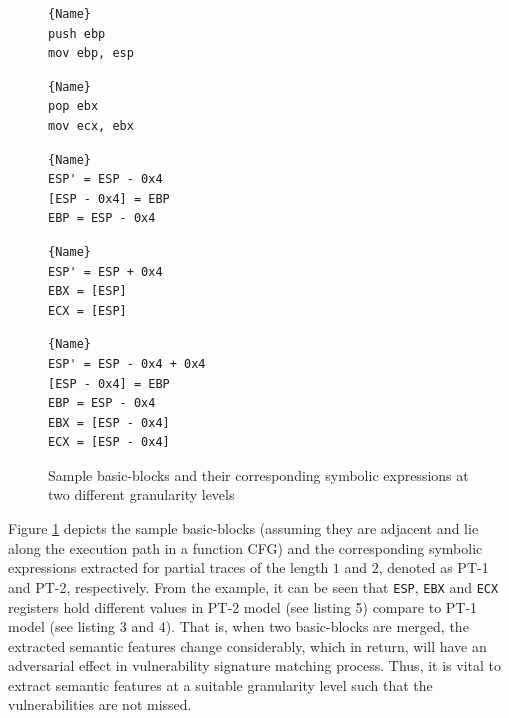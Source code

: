 \begin{figure}
\centering
\noindent
\begin{minipage}{.11\textwidth}
\begin{lstlisting}[caption=BB1,frame=tlrb]{Name}
push ebp
mov ebp, esp
\end{lstlisting}
\end{minipage}\hfill
\begin{minipage}{.11\textwidth}
\begin{lstlisting}[caption=BB2,frame=tlrb]{Name}
pop ebx
mov ecx, ebx
\end{lstlisting}
\end{minipage}\hfill
\begin{minipage}{.15\textwidth}
\begin{lstlisting}[caption=sym. expr for BB1 (partial trace with length 1),frame=tlrb]{Name}
ESP' = ESP - 0x4
[ESP - 0x4] = EBP
EBP = ESP - 0x4
\end{lstlisting}
\end{minipage}\hfill

\begin{minipage}{.15\textwidth}
\begin{lstlisting}[caption=sym. expr for BB2 (partial trace with length 1),frame=tlrb]{Name}
ESP' = ESP + 0x4
EBX = [ESP]
ECX = [ESP]
\end{lstlisting}
\end{minipage}\hfill
\begin{minipage}{.20\textwidth}
\begin{lstlisting}[caption=sym. expr for both BBs combined (partial trace with length 2),frame=tlrb]{Name}
ESP' = ESP - 0x4 + 0x4
[ESP - 0x4] = EBP
EBP = ESP - 0x4
EBX = [ESP - 0x4]
ECX = [ESP - 0x4]
\end{lstlisting}
\end{minipage}
\caption{Sample basic-blocks and their corresponding symbolic expressions at two different granularity levels} \label{fig:sym_expr_granu}
\end{figure}

Figure \ref{fig:sym_expr_granu} depicts the sample basic-blocks (assuming they are adjacent and lie along the execution path in a function CFG) and the corresponding symbolic expressions extracted for partial traces of the length $1$ and $2$, denoted as PT-1 and PT-2, respectively. From the example, it can be seen that \texttt{ESP}, \texttt{EBX} and \texttt{ECX} registers hold different values in PT-2 model (see listing 5) compare to PT-1 model (see listing 3 and 4). That is, when two basic-blocks are merged, the extracted semantic features change considerably, which in return, will have an adversarial effect in vulnerability signature matching process. Thus, it is vital to extract semantic features at a suitable granularity level such that the vulnerabilities are not missed.

